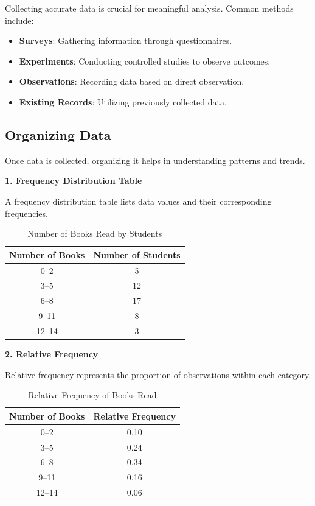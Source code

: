 \documentclass[twoside]{book}
\begin{document}
Collecting accurate data is crucial for meaningful analysis. Common methods include:

\begin{itemize}
    \item \textbf{Surveys}: Gathering information through questionnaires.
    \item \textbf{Experiments}: Conducting controlled studies to observe outcomes.
    \item \textbf{Observations}: Recording data based on direct observation.
    \item \textbf{Existing Records}: Utilizing previously collected data.
\end{itemize}

\subsection{Organizing Data}

Once data is collected, organizing it helps in understanding patterns and trends.

\textbf{1. Frequency Distribution Table}

A frequency distribution table lists data values and their corresponding frequencies.

\begin{table}[h]
\centering
\begin{tabular}{c|c}
\hline
\textbf{Number of Books} & \textbf{Number of Students} \\
\hline
0--2 & 5 \\
3--5 & 12 \\
6--8 & 17 \\
9--11 & 8 \\
12--14 & 3 \\
\hline
\end{tabular}
\caption{Number of Books Read by Students}
\end{table}

\textbf{2. Relative Frequency}

Relative frequency represents the proportion of observations within each category.

\begin{table}[h]
\centering
\begin{tabular}{c|c}
\hline
\textbf{Number of Books} & \textbf{Relative Frequency} \\
\hline
0--2 & 0.10 \\
3--5 & 0.24 \\
6--8 & 0.34 \\
9--11 & 0.16 \\
12--14 & 0.06 \\
\hline
\end{tabular}
\caption{Relative Frequency of Books Read}
\end{table}
\end{document}
